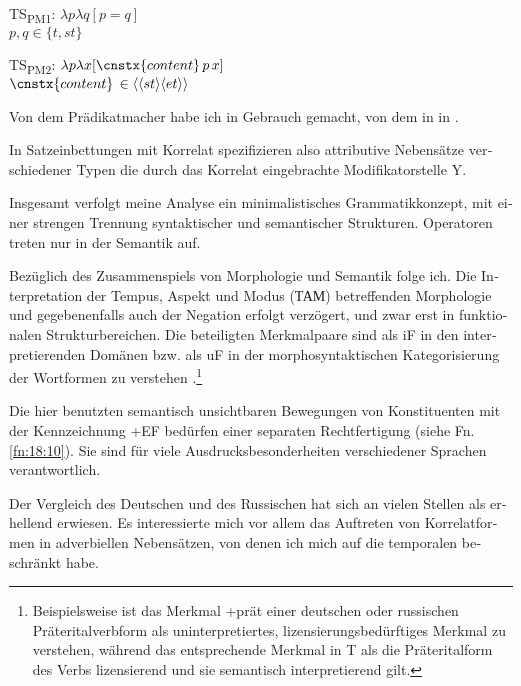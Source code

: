\documentclass[output=paper, colorlinks, citecolor=brown, booklanguage=german]{langscibook}
\begin{document}
\begin{otherlanguage}{german}
\ea \label{ex:18:48} TS\textsubscript{PM1}: $\lambda p \lambda q [p = q]$\\
$p, q \in \{t, st\}$
\z

\ea \label{ex:18:49} TS\textsubscript{PM2}: $\lambda p \lambda x [\cnstx{content}\, p\, x]$\\
$\cnstx{content}\, \in \langle\langle st \rangle\langle et \rangle\rangle$
\z

\noindent Von dem Prädikatmacher  habe ich in \citet{Zimmermann2016} Gebrauch ge\-macht, von dem in  in \citet{Zimmermann2015}.

In Satzeinbettungen mit Korrelat spezifizieren also attributive Nebensätze verschiedener Typen die durch das Korrelat eingebrachte Modifikatorstelle Y.

Insgesamt verfolgt meine Analyse ein minimalistisches Grammatikkonzept, mit einer strengen Trennung syntaktischer und semantischer Strukturen. Ope\-ra\-to\-ren treten nur in der Semantik auf.

Bezüglich des Zusammenspiels von Morphologie und Semantik folge ich\linebreak \citet{Zeijlstra2004,Pitsch2014,Pitsch2014a,Gronn-Stechow2010,Gronn-Stechow2012,Gronn-Stechow2013a,Stechow-Gronn2013}. Die Interpretation der Tempus, Aspekt und Modus (ТАМ) betreffenden Morphologie und gegebenenfalls auch der Negation erfolgt verzögert, und zwar erst in funktionalen Strukturbereichen. Die beteiligten Merkmalpaare sind als iF in den interpretierenden Domänen bzw. als uF in der mor\-pho\-syn\-tak\-ti\-schen Kategorisierung der Wortformen zu verstehen \citep{Zimmermann1990,Zimmermann2013,Zimmermann2015a,Zimmermann2015,Zimmermann2016}.\footnote{\label{fn:18:11}Beispielsweise ist das Merkmal +prät einer deutschen oder russischen Präteritalverbform als uninterpretiertes, lizensierungsbedürftiges Merkmal zu verstehen, während das entsprechende Merkmal in T als die Präteritalform des Verbs lizensierend und sie semantisch interpretierend gilt.}

Die hier benutzten semantisch unsichtbaren Bewegungen von Konstituenten mit der Kennzeichnung +EF bedürfen einer separaten Rechtfertigung (siehe Fn. \ref{fn:18:10}). Sie sind für viele Ausdrucksbesonderheiten verschiedener Sprachen verantwortlich.

Der Vergleich des Deutschen und des Russischen hat sich an vielen Stellen als erhellend erwiesen. Es interessierte mich vor allem das Auftreten von Korrelatformen in adverbiellen Nebensätzen, von denen ich mich auf die temporalen beschränkt habe.


\end{otherlanguage}
\end{document}
